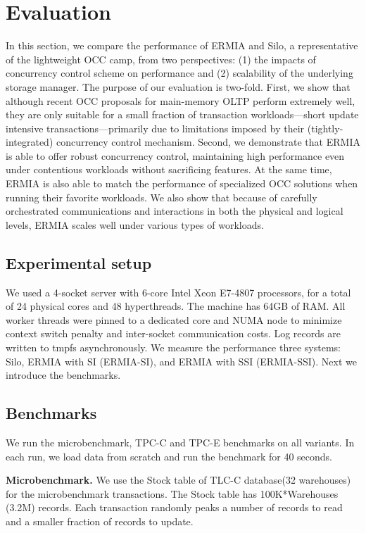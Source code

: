 
\section{Evaluation}
In this section, we compare the performance of ERMIA and Silo, a representative of the lightweight OCC camp, from two perspectives: (1) the impacts of concurrency control scheme on performance and (2) scalability of the underlying storage manager. The purpose of our evaluation is two-fold. First, we show that although recent OCC proposals for main-memory OLTP perform extremely well, they are only suitable for a small fraction of transaction workloads---short update intensive transactions---primarily due to limitations imposed by their (tightly-integrated) concurrency control mechanism. Second, we demonstrate that ERMIA is able to offer robust concurrency control, maintaining high performance even under contentious workloads without sacrificing features. At the same time, ERMIA is also able to match the performance of specialized OCC solutions when running their favorite workloads. We also show that because of carefully orchestrated communications and interactions in both the physical and logical levels, ERMIA scales well under various types of workloads.

\subsection{Experimental setup}
We used a 4-socket server with 6-core Intel Xeon E7-4807 processors, for a total of 24 physical cores and 48 hyperthreads. The machine has 64GB of RAM. All worker threads were pinned to a dedicated core and NUMA node to minimize context switch penalty and inter-socket communication costs. Log records are written to tmpfs asynchronously. We measure the performance three systems: Silo, ERMIA with SI (ERMIA-SI), and ERMIA with SSI (ERMIA-SSI). Next we introduce the benchmarks.

\subsection{Benchmarks}
We run the microbenchmark, TPC-C and TPC-E benchmarks on all variants. In each run, we load data from scratch and run the benchmark for 40 seconds.

\textbf{Microbenchmark.}
We use the Stock table of TLC-C database(32 warehouses) for the microbenchmark transactions. The Stock table has 100K*Warehouses (3.2M) records. Each transaction randomly peaks a number of records to read and a smaller fraction of records to update.

